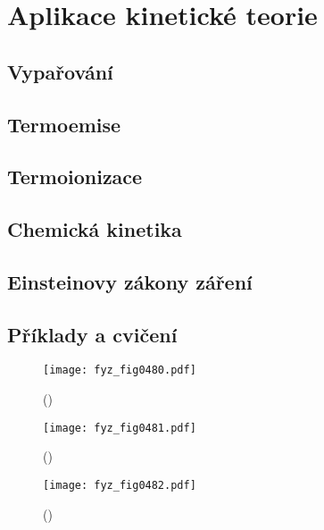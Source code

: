 \setchaptertoc
\chapter{Aplikace kinetické teorie}\label{fyz:IchapXLII}

  \section{Vypařování}\label{fyz:IchapXLIIsecI}
  \section{Termoemise}\label{fyz:IchapXLIIsecII}
  \section{Termoionizace}\label{fyz:IchapXLIIsecIII}
  \section{Chemická kinetika}\label{fyz:IchapXLIIsecIV}
  \section{Einsteinovy zákony záření}\label{fyz:IchapXLIIsecV}
  \section{Příklady a cvičení}\label{fyz:IchapXVLIIsecVI}

    \begin{figure}[ht!] %
      \centering
      \texttt{[image: fyz\_fig0480.pdf]}
      \caption{ 
               (\cite[s.~707]{Feynman01})}
      \label{fyz:fig0480}
    \end{figure}

    \begin{figure}[ht!] %
      \centering
      \texttt{[image: fyz\_fig0481.pdf]}
      \caption{ 
               (\cite[s.~707]{Feynman01})}
      \label{fyz:fig0481}
    \end{figure}

    \begin{figure}[ht!] %
      \centering
      \texttt{[image: fyz\_fig0482.pdf]}
      \caption{ 
               (\cite[s.~707]{Feynman01})}
      \label{fyz:fig0482}
    \end{figure}
